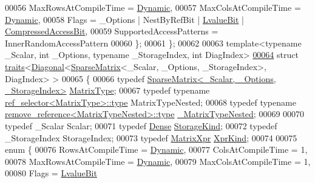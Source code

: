 \begin{DoxyCode}
00056     MaxRowsAtCompileTime = \hyperlink{namespace_eigen_ad81fa7195215a0ce30017dfac309f0b2}{Dynamic},
00057     MaxColsAtCompileTime = \hyperlink{namespace_eigen_ad81fa7195215a0ce30017dfac309f0b2}{Dynamic},
00058     Flags = \_Options | NestByRefBit | \hyperlink{group__flags_gae2c323957f20dfdc6cb8f44428eaec1a}{LvalueBit} | \hyperlink{group__flags_gaed0244284da47a2b8661261431173caf}{CompressedAccessBit},
00059     SupportedAccessPatterns = InnerRandomAccessPattern
00060   \};
00061 \};
00062 
00063 \textcolor{keyword}{template}<\textcolor{keyword}{typename} \_Scalar, \textcolor{keywordtype}{int} \_Options, \textcolor{keyword}{typename} \_StorageIndex, \textcolor{keywordtype}{int} DiagIndex>
\hyperlink{struct_eigen_1_1internal_1_1traits_3_01_diagonal_3_01_sparse_matrix_3_01___scalar_00_01___option6bd26e34064fdba33a44f3bb621d4cca}{00064} \textcolor{keyword}{struct }\hyperlink{struct_eigen_1_1internal_1_1traits}{traits}<\hyperlink{group___core___module_class_eigen_1_1_diagonal}{Diagonal}<\hyperlink{group___sparse_core___module_class_eigen_1_1_sparse_matrix}{SparseMatrix}<\_Scalar, \_Options, \_StorageIndex>, DiagIndex>
       >
00065 \{
00066   \textcolor{keyword}{typedef} \hyperlink{group___sparse_core___module_class_eigen_1_1_sparse_matrix}{SparseMatrix<\_Scalar, \_Options, \_StorageIndex>} 
      \hyperlink{group___sparse_core___module_class_eigen_1_1_sparse_matrix}{MatrixType};
00067   \textcolor{keyword}{typedef} \textcolor{keyword}{typename} \hyperlink{struct_eigen_1_1internal_1_1ref__selector}{ref\_selector<MatrixType>::type} MatrixTypeNested;
00068   \textcolor{keyword}{typedef} \textcolor{keyword}{typename} \hyperlink{group___sparse_core___module}{remove\_reference<MatrixTypeNested>::type} 
      \hyperlink{group___sparse_core___module}{\_MatrixTypeNested};
00069 
00070   \textcolor{keyword}{typedef} \_Scalar Scalar;
00071   \textcolor{keyword}{typedef} \hyperlink{struct_eigen_1_1_dense}{Dense} \hyperlink{struct_eigen_1_1_dense}{StorageKind};
00072   \textcolor{keyword}{typedef} \_StorageIndex StorageIndex;
00073   \textcolor{keyword}{typedef} \hyperlink{struct_eigen_1_1_matrix_xpr}{MatrixXpr} \hyperlink{struct_eigen_1_1_matrix_xpr}{XprKind};
00074 
00075   \textcolor{keyword}{enum} \{
00076     RowsAtCompileTime = \hyperlink{namespace_eigen_ad81fa7195215a0ce30017dfac309f0b2}{Dynamic},
00077     ColsAtCompileTime = 1,
00078     MaxRowsAtCompileTime = \hyperlink{namespace_eigen_ad81fa7195215a0ce30017dfac309f0b2}{Dynamic},
00079     MaxColsAtCompileTime = 1,
00080     Flags = \hyperlink{group__flags_gae2c323957f20dfdc6cb8f44428eaec1a}{LvalueBit}

\end{DoxyCode}
